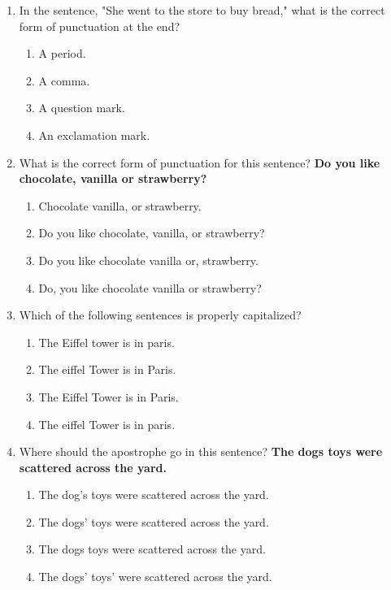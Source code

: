 \documentclass[12pt]{article}
\begin{document}
\begin{enumerate}
\vspace{0.5cm}

\item In the sentence, "She went to the store to buy bread," what is the correct form of punctuation at the end?
\begin{enumerate}[label=\Alph*.]
    \item A period.
    \item A comma.
    \item A question mark.
    \item An exclamation mark.
\end{enumerate}

\vspace{0.5cm}

\item What is the correct form of punctuation for this sentence?
\textbf{Do you like chocolate, vanilla or strawberry?}
\begin{enumerate}[label=\Alph*.]
    \item Chocolate vanilla, or strawberry.
    \item Do you like chocolate, vanilla, or strawberry?
    \item Do you like chocolate vanilla or, strawberry.
    \item Do, you like chocolate vanilla or strawberry?
\end{enumerate}

\vspace{0.5cm}

\item Which of the following sentences is properly capitalized?
\begin{enumerate}[label=\Alph*.]
    \item The Eiffel tower is in paris.
    \item The eiffel Tower is in Paris.
    \item The Eiffel Tower is in Paris.
    \item The eiffel Tower is in paris.
\end{enumerate}

\vspace{0.5cm}

\item Where should the apostrophe go in this sentence?
\textbf{The dogs toys were scattered across the yard.}
\begin{enumerate}[label=\Alph*.]
    \item The dog's toys were scattered across the yard.
    \item The dogs' toys were scattered across the yard.
    \item The dogs toys were scattered across the yard.
    \item The dogs' toys' were scattered across the yard.
\end{enumerate}


\end{enumerate}
\end{document}
